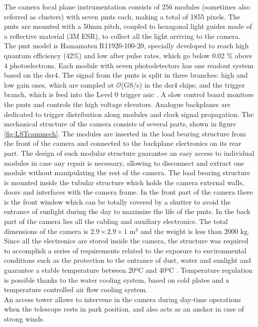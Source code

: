 \documentclass[main.tex]{subfiles}
\begin{document}
  The camera focal plane instrumentation consists of 256 modules (sometimes also referred as clusters) with seven \glspl{pmt} each, making a total of 1855 pixels. The \glspl{pmt} are mounted with a 50mm pitch, coupled to hexagonal light guides made of a reflective material (3M ESR), to collect all the light arriving to the camera. The \gls{pmt} model is Hamamatsu R11920-100-20, specially developed to reach high quantum efficiency (42\%) and low after pulse rates, which go below 0.02 \% above 4 photoelectrons. Each module with seven photodetectors has one readout system based on the \gls{dsr4}. The signal from the \glspl{pmt} is split in three branches: high and low gain ones, which are sampled at $\mathcal{O}$(GS/s) in the \gls{dsr4} chips; and the trigger branch, which is feed into the Level 0 trigger asic \cite{2017LST}. A slow control board monitors the \glspl{pmt} and controls the high voltage elevators. Analogue backplanes are dedicated to trigger distribution along modules and clock signal propagation.  
  The mechanical structure of the camera consists of several parts, shown in figure \ref{fig:LSTcammech}. The modules are inserted in the load bearing structure from the front of the camera and connected to the backplane electronics on its rear part. The design of such modular structure guarantee an easy access to individual modules in case any repair is necessary, allowing to disconnect and extract one module without manipulating the rest of the camera.
  The load bearing structure is mounted inside the tubular structure which holds the camera external walls, doors and interfaces with the camera frame. In the front part of the camera there is the front window which can be totally covered by a shutter to avoid the entrance of sunlight during the day to maximize the life of the \glspl{pmt}. In the back part of the camera lies all the cabling and auxiliary electronics. The total dimensions of the camera is $2.9\times2.9\times 1$ m$^3$ and the weight is less than 2000 kg. Since all the electronics are stored inside the camera, the structure was required to accomplish a series of requirements related to the exposure to environmental conditions such as the protection to the entrance of dust, water and sunlight and guarantee a stable temperature between 20ºC and 40ºC \cite{2013LSTCamMech}. Temperature regulation is possible thanks to the water cooling system, based on cold plates and a temperature controlled air flow cooling system.\\
 An access tower allows to intervene in the camera during day-time operations when the telescope rests in park position, and also acts as an anchor in case of strong winds. 
\end{document}

